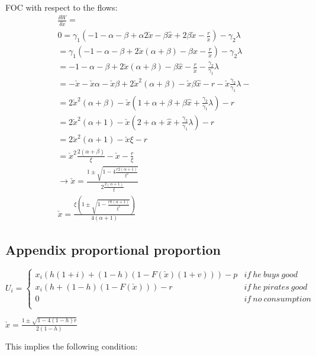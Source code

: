 \documentclass{article}
\begin{document}
FOC with respect to the flows: 
\[
\begin{array}{ll}
\frac{\delta W}{ \delta \check{x} } = \\
0 = \gamma_1(-1-\alpha-\beta+\alpha2\check{x}-\beta \hat{x}+2\beta\check{x}-\frac{r}{\check{x}}) -\gamma_2 \lambda  \\
= \gamma_1(-1-\alpha-\beta+2\check{x}(\alpha+\beta)-\beta \hat{x}-\frac{r}{\check{x}}) -\gamma_2 \lambda \\
= -1-\alpha-\beta+2\check{x}(\alpha+\beta)-\beta \hat{x}-\frac{r}{\check{x}} -\frac{\gamma_2}{\gamma_1} \lambda \\
= -\check{x}-\check{x}\alpha-\check{x}\beta+2\check{x}^2(\alpha+\beta)-\check{x} \beta \hat{x}-r -\check{x}\frac{\gamma_2}{\gamma_1} \lambda-\\
= 2\check{x}^2(\alpha+\beta)-\check{x}(1+\alpha+\beta+\beta \hat{x}+\frac{\gamma_2}{\gamma_1} \lambda) -r\\
= 2\check{x}^2(\alpha+1)-\check{x}(2+\alpha+ \hat{x}+\frac{\gamma_2}{\gamma_1} \lambda) -r\\
= 2\check{x}^2(\alpha+1)-\check{x}\xi -r \\
= \check{x}^2 \frac{2(\alpha+\beta)}{\xi}-\check{x}-\frac{r}{\xi} \\
\rightarrow 
\check{x} = \frac{1 \pm \sqrt{1-4\frac{r2(\alpha+1)}{\xi^2}}}{2\frac{2(\alpha+1)}{\xi}} \\
\check{x} = \frac{\xi \left(1 \pm \sqrt{1-\frac{r8(\alpha+1)}{\xi^2}}\right)}{4(\alpha+1)}
\end{array}
\]



\subsection{Appendix proportional proportion}

\[
U_i= \left\{
                \begin{array}{ll}
                  x_i(h(1+i)+(1-h)(1-F(\check{x})(1+v)))-p  & if ~ he ~ buys ~ good  \\
                  x_i(h+(1-h)(1-F(\check{x})))-r &  if ~ he ~ pirates ~ good \\
									0 & if ~ no ~ consumption  \\ 
                \end{array}
\right.
\]

$\check{x}= \frac{1 \pm \sqrt{1-4(1-h)r}}{2(1-h)}$ 

This implies the following condition:
\end{document}
